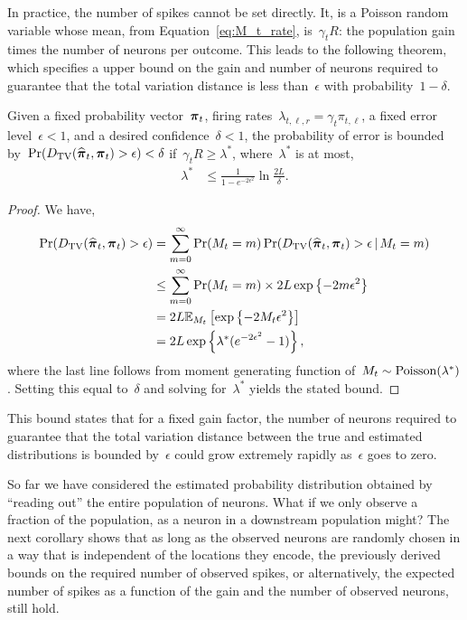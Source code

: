 In practice, the number of spikes cannot be set directly. It, is a
Poisson random variable whose mean, from Equation~\ref{eq:M_t_rate},
is~$\gamma_t R$: the population gain times the number of neurons per
outcome. This leads to the following theorem, which specifies a upper bound 
on the gain and number of neurons required to guarantee that the 
total variation distance is less than~$\epsilon$ with probability~$1-\delta$.

\begin{theorem}
  \label{thm:rate_bounds}
  Given a fixed probability vector~$\boldsymbol{\pi}_t$, firing
  rates~$\lambda_{t,\ell,r} = \gamma_t \pi_{t,\ell}$, a fixed error
  level~$\epsilon < 1$, and a desired confidence~$\delta < 1$, the
  probability of error is bounded
  by~$\Pr({D_{\mathrm{TV}}}(\widehat{\boldsymbol{\pi}}_t, \boldsymbol{\pi}_t) > \epsilon) < \delta$
  if~$\gamma_t R \geq \lambda^*$, where~$\lambda^*$ is at most,
  \begin{align}
    \lambda^* &\leq \frac{1}{1-e^{-2\epsilon^2}} \ln \frac{2L}{\delta}.  
  \end{align}
\end{theorem}

\begin{proof}
  We have, 
  \begin{align}
    \Pr({D_{\mathrm{TV}}}(\widehat{\boldsymbol{\pi}}_t, \boldsymbol{\pi}_t) > \epsilon) 
    &= \sum_{m=0}^\infty \Pr(M_t=m) \Pr({D_{\mathrm{TV}}}(\widehat{\boldsymbol{\pi}}_t, \boldsymbol{\pi}_t) > \epsilon \,|\, M_t=m) \\
    &\leq \sum_{m=0}^\infty  \Pr(M_t=m) \times 2L \exp \left \{-2m\epsilon^2 \right\} \\
    &= 2L \mathbb{E}_{M_t} \left[ \exp \left \{ -2M_t \epsilon^2 \right \} \right] \\
    &= 2L \exp \left \{\lambda^* (e^{-2\epsilon^2}-1) \right\},
  \end{align}
  where the last line follows from moment generating function of~${M_t \sim \mathrm{Poisson}(\lambda^*)}$.
  Setting this equal to~$\delta$ and solving for~$\lambda^*$ yields the stated bound.
\end{proof}

This bound states that for a fixed gain factor, the number of neurons
required to guarantee that the total variation distance between the
true and estimated distributions is bounded by~$\epsilon$ could grow
extremely rapidly as~$\epsilon$ goes to zero.

So far we have considered the estimated probability distribution
obtained by ``reading out'' the entire population of neurons. What if
we only observe a fraction of the population, as a neuron in a
downstream population might? The next corollary shows that as long as
the observed neurons are randomly chosen in a way that is independent
of the locations they encode, the previously derived bounds on the required 
number of observed spikes, or alternatively, the expected number of 
spikes as a function of the gain and the number of observed neurons, 
still hold. 

